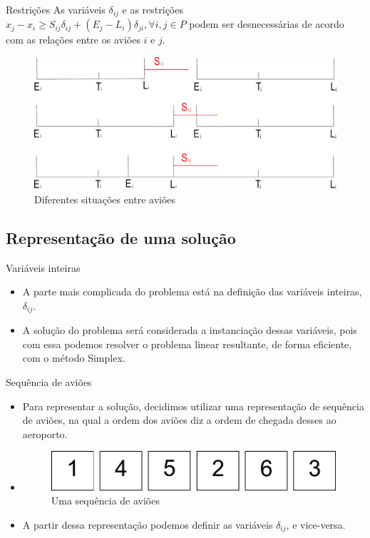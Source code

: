 \documentclass[xcolor=dvipsnames]{beamer}
\begin{document}
\begin{frame}{Restrições}
  As variáveis $\delta_{ij}$ e as restrições $x_j - x_i \ge S_{ij}\delta_{ij} + (E_j - L_i)\delta_{ji}, \forall i,j \in P$ podem ser desnecessárias de acordo com as relações entre os aviões $i$ e $j$.
\begin{figure}[h]
     \centering
      \includegraphics[scale=0.4]{diff.pdf}
     \caption{Diferentes situações entre aviões}
     \label{im2}
\end{figure}

\end{frame}

\subsection{Representação de uma solução}

\begin{frame}{Variáveis inteiras}
 \begin{itemize}[<+-| alert@+>]
  \item{A parte mais complicada do problema está na definição das variáveis inteiras, $\delta_{ij}$.}
  \item{A solução do problema será considerada a instanciação dessas variáveis, pois com essa podemos resolver o problema linear resultante, de forma eficiente, com o método Simplex.}
 \end{itemize} 
\end{frame}

\begin{frame}{Sequência de aviões}
 \begin{itemize}[<+-| alert@+>]
  \item{Para representar a solução, decidimos utilizar uma representação de sequência de aviões, na qual a ordem dos aviões diz a ordem de chegada desses ao aeroporto.}
 \item{
\begin{figure}[h]
      \includegraphics[scale=0.4]{seq.pdf}
     \caption{Uma sequência de aviões}
     \label{im3}
\end{figure}
}
  \item{A partir dessa representação podemos definir as variáveis $\delta_{ij}$, e vice-versa.}
 \end{itemize}  
\end{frame}
\end{document}
